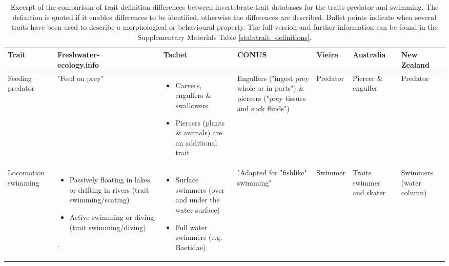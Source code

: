 \documentclass[12pt]{article}
\makeatletter
\newcommand{\specialcell}[2][c]{%
  \begin{tabular}[#1]{@{}c@{}}#2\end{tabular}}
\makeatother
\begin{document}
\begin{landscape}
  \begin{longtable}{m{2.0cm}|m{4.0cm}|m{4.2cm}|m{4.2cm}|m{1.7cm}|m{2cm}|m{2.2cm}}
      \caption{Excerpt of the comparison of trait definition differences between invertebrate trait databases for the traits predator and swimming. The definition is quoted if it enables differences to be identified, otherwise the differences are described. Bullet points indicate when several traits have been used to describe a morphological or behavioural property. The full version and further information can be found in the Supplementary Materials Table \ref{stab:trait_definitions}.}
      \label{tab:trait_definitions}
      \endfirsthead
      \toprule[.1em]
      Trait & \specialcell{Freshwater- \\ ecology.info} & Tachet & CONUS & Vieira & Australia & \specialcell{New \\ Zealand} \\
      \toprule[.1em]
      Feeding predator & 
        "Feed on prey" & 
        \begin{itemize}
            \item Carvers, engulfers \& swallowers
            \item Piercers (plants \& animals) are an additional trait
        \end{itemize} & %
        Engulfers ("ingest prey whole or in parts") \& 
        piercers ("prey tissues and suck fluids") & 
        Predator &
        Piercer \& engulfer &
        Predator
        \\ 
        \midrule
        Locomotion swimming & 
        \begin{itemize}
            \item Passively floating  in lakes or drifting in rivers (trait swimming/scating)
            \item Active swimming or diving (trait swimming/diving)
        \end{itemize}. &
        \begin{itemize}
            \item Surface swimmers (over and under the water surface)
            \item Full water swimmers (e.g. Baetidae).
        \end{itemize} & 
        "Adapted for "fishlike" swimming" & 
        Swimmer & 
        Traits swimmer and skater & 
        Swimmers (water column)
        \\
      \bottomrule
  \end{longtable}
\end{landscape}
\end{document}
